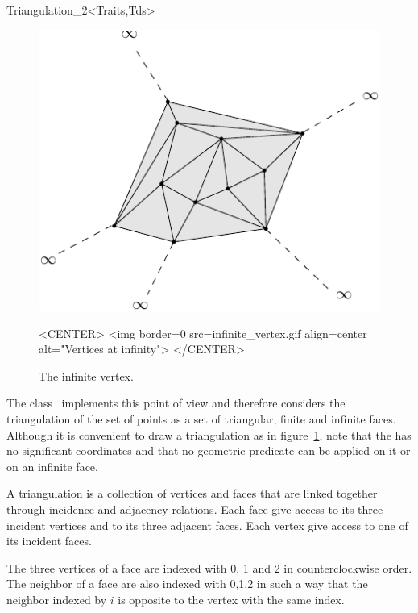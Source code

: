 \begin{ccRefClass}{Triangulation_2<Traits,Tds>}
\begin{figure}[h]
\begin{ccTexOnly}
\begin{center} \includegraphics[scale=0.5]{Triangulation_2_ref/infinite_vertex} \end{center}
\end{ccTexOnly}
\caption{The infinite vertex.
\label{Triangulation_ref_Fig_infinite_vertex}}
\begin{ccHtmlOnly}
<CENTER>
<img border=0 src=infinite_vertex.gif align=center alt="Vertices at
infinity">
</CENTER>
\end{ccHtmlOnly}
\end{figure}

The class \ccRefName\
implements this point of view
and therefore considers  the triangulation of the set of points 
as a set of  triangular,  finite and
infinite faces. 
Although it is convenient to draw a triangulation as in
figure~\ref{Triangulation_ref_Fig_infinite_vertex}, note that
the  has no significant
coordinates and that no geometric predicate can be applied on it
or on an infinite face.

A triangulation is a collection of vertices and faces that
are linked together through incidence and adjacency relations.
Each face give access to its three incident vertices and to
its 
three adjacent faces. Each vertex give access to one of its  incident
faces. 

The three vertices of a face are indexed with 0, 1 and 2
in counterclockwise order. The neighbor of a face are also 
indexed with 0,1,2 in such a way that the neighbor indexed by $i$
is opposite to the vertex with the same index.


\end{ccRefClass}
